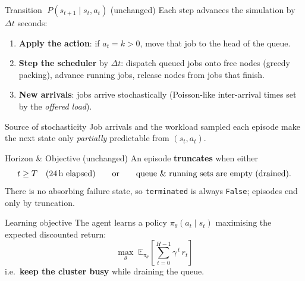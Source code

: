 \begin{frame}{Transition $\;P(s_{t+1}\mid s_t, a_t)$ \hfill \small\textcolor{SkyBlue!70!black}{(unchanged)}}
  \small
  Each step advances the simulation by $\Delta t$ seconds:
  \begin{enumerate}
    \item \textbf{Apply the action}: if $a_t = k > 0$, move that job to the head of the queue.
    \item \textbf{Step the scheduler} by $\Delta t$: dispatch queued jobs onto free
          nodes (greedy packing), advance running jobs, release nodes from jobs that finish.
    \item \textbf{New arrivals}: jobs arrive stochastically (Poisson-like
          inter-arrival times set by the \emph{offered load}).
  \end{enumerate}
  \begin{block}{Source of stochasticity}
    Job arrivals and the workload sampled each episode make the next state only
    \emph{partially} predictable from $(s_t, a_t)$.
  \end{block}
\end{frame}

\begin{frame}{Horizon \& Objective \hfill \small\textcolor{SkyBlue!70!black}{(unchanged)}}
  \small
  An episode \textbf{truncates} when either
  $$ t \geq T \quad(\text{24\,h elapsed}) \qquad\text{or}\qquad \text{queue \& running sets are empty (drained).} $$
  There is no absorbing failure state, so \texttt{terminated} is always \texttt{False};
  episodes end only by truncation.

  \begin{block}{Learning objective}
    The agent learns a policy $\pi_\theta(a_t \mid s_t)$ maximising the expected
    discounted return:
    $$ \max_{\theta}\; \mathbb{E}_{\pi_\theta}\!\left[\sum_{t=0}^{H-1} \gamma^{\,t}\, r_t\right] $$
    i.e.\ \textbf{keep the cluster busy} while draining the queue.
  \end{block}
\end{frame}
